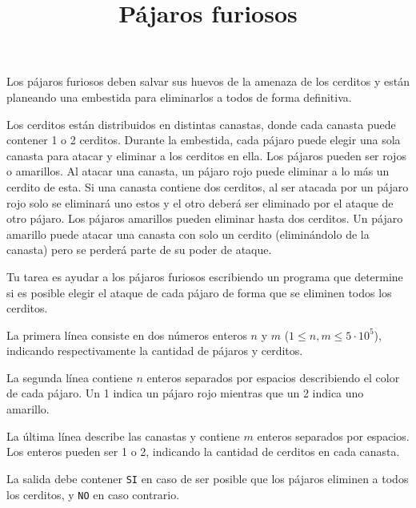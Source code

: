 \documentclass{oci}
\title{Pájaros furiosos}
\begin{document}
\begin{problemDescription}
Los pájaros furiosos deben salvar sus huevos de la amenaza de los
cerditos y están planeando una embestida
para eliminarlos a todos de forma definitiva.

Los cerditos están distribuidos en distintas canastas, donde cada
canasta puede contener 1 o 2 cerditos.
Durante la embestida, cada pájaro puede elegir una sola canasta para
atacar y eliminar a los cerditos en ella.
Los pájaros pueden ser rojos o amarillos.
Al atacar una canasta, un pájaro rojo puede eliminar a lo más un
cerdito de esta.
Si una canasta contiene dos cerditos, al ser atacada por un pájaro rojo
solo se eliminará uno estos y el otro deberá ser eliminado por el ataque de
otro pájaro.
Los pájaros amarillos pueden eliminar hasta dos cerditos.
Un pájaro amarillo puede atacar una canasta con solo un cerdito
(eliminándolo de la canasta) pero se perderá parte de su poder
de ataque.

Tu tarea es ayudar a los pájaros furiosos escribiendo un programa
que determine si es posible elegir el ataque de cada pájaro de forma
que se eliminen todos los cerditos.
\end{problemDescription}

\begin{inputDescription}
	La primera línea consiste en dos números enteros $n$ y $m$ ($1 \leq n, m \leq 5 \cdot 10^5$),
	indicando respectivamente la cantidad de pájaros y cerditos.

	La segunda línea contiene $n$ enteros separados por espacios describiendo
	el color de cada pájaro.
	Un 1 indica un pájaro rojo mientras que un 2 indica uno amarillo.

	La última línea describe las canastas y contiene $m$ enteros separados por espacios.
	Los enteros pueden ser 1 o 2, indicando la cantidad de cerditos en cada canasta.
\end{inputDescription}

\begin{outputDescription}
	La salida debe contener \texttt{SI} en caso de ser posible que los pájaros
	eliminen a todos los cerditos, y \texttt{NO} en caso contrario.
\end{outputDescription}

\begin{sampleDescription}
\end{sampleDescription}
\end{document}
